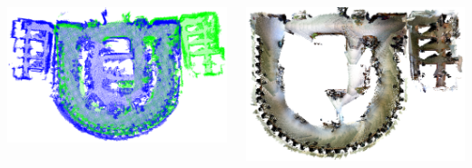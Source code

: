 \documentclass[28pt, a4paper, landscape]{tikzposter}
\begin{document}
\begin{columns}
{\begin{minipage}[t]{0.33\linewidth}
\begin{tikzfigure}
        \centering
        \includegraphics[width=\linewidth]{rotunda_merged.png}
\end{tikzfigure}
\end{minipage}
\hfill
\begin{minipage}[t]{0.27\linewidth}
    \begin{tikzfigure}[Map 2]
        \centering
        \includegraphics[width=\linewidth]{../img/mff_rotunda_1.png}
\end{tikzfigure}
\end{minipage}
} %


\end{columns}
\end{document}
